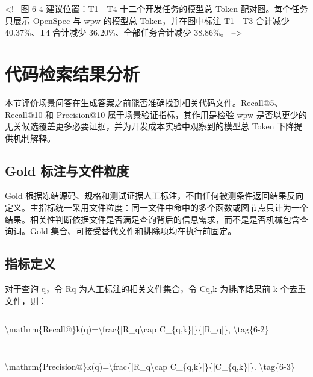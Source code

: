 <!-- 图 6-4 建议位置：T1—T4 十二个开发任务的模型总 Token 配对图。每个任务只展示 OpenSpec 与 wpw 的模型总 Token，并在图中标注 T1—T3 合计减少 40.37\%、T4 合计减少 36.20\%、全部任务合计减少 38.86\%。 -->


\section{代码检索结果分析}
本节评价场景问答在生成答案之前能否准确找到相关代码文件。Recall@5、Recall@10 和 Precision@10 属于场景验证指标，其作用是检验 wpw 是否以更少的无关候选覆盖更多必要证据，并为开发成本实验中观察到的模型总 Token 下降提供机制解释。


\subsection{Gold 标注与文件粒度}
Gold 根据冻结源码、规格和测试证据人工标注，不由任何被测条件返回结果反向定义。主指标统一采用文件粒度：同一文件中命中的多个函数或图节点只计为一个结果。相关性判断依据文件是否满足查询背后的信息需求，而不是是否机械包含查询词。Gold 集合、可接受替代文件和排除项均在执行前固定。


\subsection{指标定义}
对于查询 q，令 Rq 为人工标注的相关文件集合，令 Cq,k 为排序结果前 k 个去重文件，则：

\begin{equation}

\end{equation}

\textbackslash{}mathrm\{Recall@\}k(q)=\textbackslash{}frac\{|R\_q\textbackslash{}cap C\_\{q,k\}|\}\{|R\_q|\}, \textbackslash{}tag\{6-2\}

\begin{equation}

\end{equation}

\begin{equation}

\end{equation}

\textbackslash{}mathrm\{Precision@\}k(q)=\textbackslash{}frac\{|R\_q\textbackslash{}cap C\_\{q,k\}|\}\{|C\_\{q,k\}|\}. \textbackslash{}tag\{6-3\}

\begin{equation}

\end{equation}

